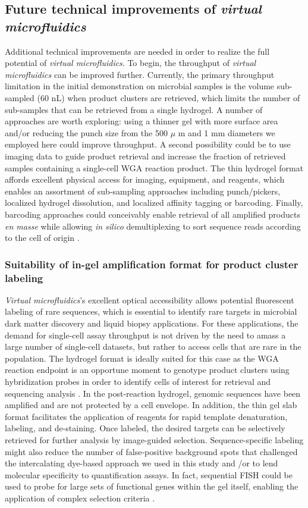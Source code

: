 \subsection{Future technical improvements of \textit{virtual microfluidics}}
Additional technical improvements are needed in order to realize the full potential of \textit{virtual microfluidics}. To begin, the throughput of \textit{virtual microfluidics} can be improved further. Currently, the primary throughput limitation in the initial demonstration on microbial samples is the volume sub-sampled (60 nL) when product clusters are retrieved, which limits the number of sub-samples that can be retrieved from a single hydrogel. A number of approaches are worth exploring: using a thinner gel with more surface area and\slash or reducing the punch size from the 500 $\mu$ m and 1 mm diameters we employed here could improve throughput. A second possibility could be to use imaging data to guide product retrieval and increase the fraction of retrieved samples containing a single-cell WGA reaction product. The thin hydrogel format affords excellent physical access for imaging, equipment, and reagents, which enables an assortment of sub-sampling approaches including punch\slash pickers, localized hydrogel dissolution, and localized affinity tagging or barcoding. Finally, barcoding approaches could conceivably enable retrieval of all amplified products \textit{en masse} while allowing \textit{in silico} demultiplexing to sort sequence reads according to the cell of origin \cite{Crosetto:2015vd}.

\subsubsection{Suitability of in-gel amplification format for product cluster labeling}
\textit{Virtual microfluidics}'s excellent optical accessibility allows potential fluorescent labeling of rare sequences, which is essential to identify rare targets in microbial dark matter discovery and liquid biopsy applications. For these applications, the demand for single-cell assay throughput is not driven by the need to amass a large number of single-cell datasets, but rather to access cells that are rare in the population. The hydrogel format is ideally suited for this case as the WGA reaction endpoint is an opportune moment to genotype product clusters using hybridization probes in order to identify cells of interest for retrieval and sequencing analysis \cite{Niki:1997vq,Yamada:2011kf}. In the post-reaction hydrogel, genomic sequences have been amplified and are not protected by a cell envelope. In addition, the thin gel slab format facilitates the application of reagents for rapid template denaturation, labeling, and de-staining. Once labeled, the desired targets can be selectively retrieved for further analysis by image-guided selection. Sequence-specific labeling might also reduce the number of false-positive background spots that challenged the intercalating dye-based approach we used in this study and \slash or to lend molecular specificity to quantification assays. In fact, sequential FISH could be used to probe for large sets of functional genes within the gel itself, enabling the application of complex selection criteria \cite{Lubeck:2014jx}. 

